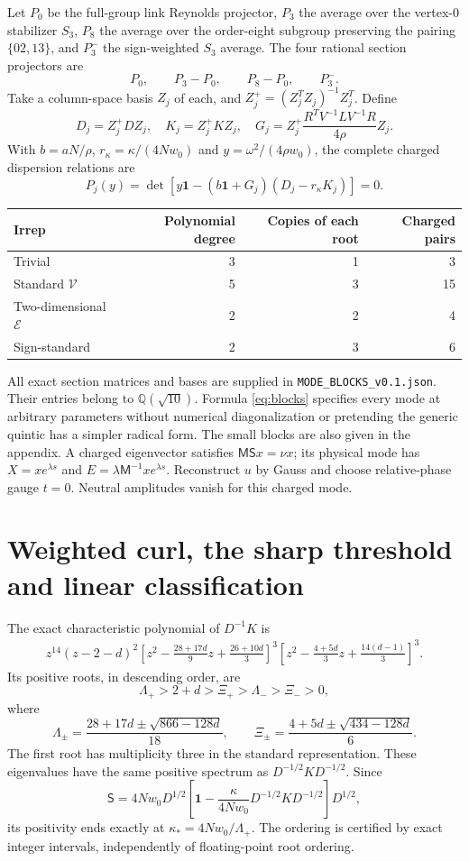 \documentclass[11pt,a4paper]{article}
\newcommand{\id}{\mathbf1}\newcommand{\tr}{\operatorname{tr}}\newcommand{\diag}{\operatorname{diag}}\newcommand{\Rea}{\operatorname{Re}}
\begin{document}
Let $P_0$ be the full-group link Reynolds projector, $P_3$ the average over the vertex-$0$ stabilizer $S_3$, $P_8$ the average over the order-eight subgroup preserving the pairing $\{02,13\}$, and $P_3^-$ the sign-weighted $S_3$ average. The four rational section projectors are
\[
P_0,\qquad P_3-P_0,\qquad P_8-P_0,\qquad P_3^-.
\]
Take a column-space basis $Z_j$ of each, and $Z_j^+=(Z_j^TZ_j)^{-1}Z_j^T$. Define
\[
D_j=Z_j^+DZ_j,\quad K_j=Z_j^+KZ_j,\quad
G_j=Z_j^+\frac{R^TV^{-1}LV^{-1}R}{4\rho}Z_j.
\]
With $b=aN/\rho$, $r_\kappa=\kappa/(4Nw_0)$ and $y=\omega^2/(4\rho w_0)$, the complete charged dispersion relations are
\begin{equation}
\boxed{P_j(y)=\det\left[y\id-(b\id+G_j)(D_j-r_\kappa K_j)\right]=0.}\label{eq:blocks}
\end{equation}
\begin{center}
\begin{tabular}{lrrr}
\toprule
Irrep & Polynomial degree & Copies of each root & Charged pairs\\
\midrule
Trivial & 3 & 1 & 3\\
Standard $\mathcal V$ & 5 & 3 & 15\\
Two-dimensional $\mathcal E$ & 2 & 2 & 4\\
Sign-standard & 2 & 3 & 6\\
\bottomrule
\end{tabular}
\end{center}
All exact section matrices and bases are supplied in \texttt{MODE\_BLOCKS\_v0.1.json}. Their entries belong to $\mathbb Q(\sqrt{10})$. Formula \eqref{eq:blocks} specifies every mode at arbitrary parameters without numerical diagonalization or pretending the generic quintic has a simpler radical form. The small blocks are also given in the appendix. A charged eigenvector satisfies $\mathsf M\mathsf S x=\nu x$; its physical mode has $X=x e^{\lambda s}$ and $E=\lambda\mathsf M^{-1}x e^{\lambda s}$. Reconstruct $u$ by Gauss and choose relative-phase gauge $t=0$. Neutral amplitudes vanish for this charged mode.

\newpage
\section{Weighted curl, the sharp threshold and linear classification}
The exact characteristic polynomial of $D^{-1}K$ is
\begin{align*}
z^{14}(z-2-d)^2
\left[z^2-\frac{28+17d}{9}z+\frac{26+10d}{3}\right]^3
\left[z^2-\frac{4+5d}{3}z+\frac{14(d-1)}3\right]^3.
\end{align*}
Its positive roots, in descending order, are
\[
\Lambda_+>2+d>\Xi_+>\Lambda_->\Xi_->0,
\]
where
\[
\Lambda_\pm=\frac{28+17d\pm\sqrt{866-128d}}{18},\qquad
\Xi_\pm=\frac{4+5d\pm\sqrt{434-128d}}6.
\]
The first root has multiplicity three in the standard representation. These eigenvalues have the same positive spectrum as $D^{-1/2}KD^{-1/2}$. Since
\[
\mathsf S=4Nw_0D^{1/2}
\left[\id-\frac{\kappa}{4Nw_0}D^{-1/2}KD^{-1/2}\right]D^{1/2},
\]
its positivity ends exactly at $\kappa_*=4Nw_0/\Lambda_+$. The ordering is certified by exact integer intervals, independently of floating-point root ordering.
\end{document}
